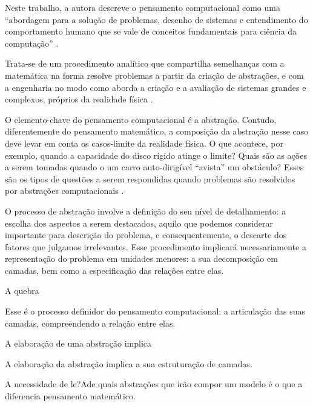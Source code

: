 Neste trabalho, a autora descreve o pensamento computacional como uma ``abordagem para a solução de problemas, desenho de sistemas e entendimento do comportamento humano que se vale de conceitos fundamentais para ciência da computação'' \cite[tradução nossa]{wing2006}.

Trata-se de um procedimento analítico que compartilha semelhanças com a matemática na forma resolve problemas a partir da criação de abstrações, e com a engenharia no modo como aborda a criação e a avaliação de sistemas grandes e complexos, próprios da realidade física \cite[p.~3717]{wing2008}.

O elemento-chave do pensamento computacional é a abstração. Contudo, diferentemente do pensamento matemático, a composição da abstração nesse caso deve levar em conta os casos-limite da realidade física. O que acontece, por exemplo, quando a capacidade do disco rígido atinge o limite? Quais são as ações a serem tomadas quando o um carro auto-dirigível ``avista'' um obstáculo? Esses são os tipos de questões a serem respondidas quando problemas são resolvidos por abstrações computacionais \cite[p.~3718]{wing2008}.

O processo de abstração involve a definição do seu nível de detalhamento: a escolha dos aspectos a serem destacados, aquilo que podemos considerar importante para descrição do problema, e consequentemente, o descarte dos fatores que julgamos irrelevantes. Esse procedimento implicará necessariamente a representação do problema em unidades menores: a sua decomposição em camadas, bem como a especificação das relações entre elas.


A quebra


Esse é o processo definidor do pensamento computacional: a articulação das suas camadas, compreendendo a relação entre elas.






A elaboração de uma abstração implica 

A elaboração da abstração implica a sua estruturação de camadas.



A necessidade de le?Ade quais abstrações que irão compor um modelo é o que a diferencia pensamento matemático. 




